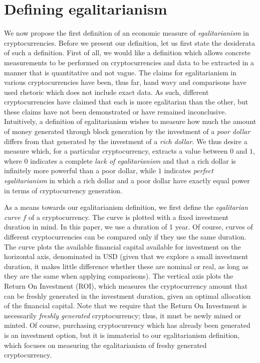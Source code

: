 
\section{Defining egalitarianism}

We now propose the first definition of an economic measure of
\emph{egalitarianism} in cryptocurrencies. Before we present our definition, let
us first state the desiderata of such a definition. First of all, we would like
a definition which allows concrete measurements to be performed on
cryptocurrencies and data to be extracted in a manner that is quantitative and
not vague. The claims for egalitarianism in various cryptocurrencies have been,
thus far, hand wavy and comparisons have used rhetoric which does not include
exact data. As such, different cryptocurrencies have claimed that each is more
egalitarian than the other, but these claims have not been demonstrated or have
remained inconclusive. Intuitively, a definition of egalitarianism wishes to
measure how much the amount of money generated through block generation by the
investment of a \emph{poor dollar} differs from that generated by the investment
of a \emph{rich dollar}. We thus desire a measure which, for a particular
cryptocurrency, extracts a value between $0$ and $1$, where $0$ indicates a
complete \emph{lack of egalitarianism} and that a rich dollar is infinitely more
powerful than a poor dollar, while $1$ indicates \emph{perfect egalitarianism}
in which a rich dollar and a poor dollar have exactly equal power in terms of
cryptocurrency generation.

As a means towards our egalitarianism definition, we first define the
\emph{egalitarian curve} $f$ of a cryptocurrency. The curve is plotted with a
fixed investment duration in mind. In this paper, we use a duration of 1 year.
Of course, curves of different cryptocurrencies can be compared only if they
use the same duration. The curve plots the available financial capital available
for investment on the horizontal axis, denominated in USD (given that we explore
a small investment duration, it makes little difference whether these are
nominal or real, as long as they are the same when applying comparisons). The
vertical axis plots the Return On Investment (ROI), which measures the
cryptocurrency amount that can be freshly generated in the investment duration,
given an optimal allocation of the financial capital. Note that we require that
the Return On Investment is necessarily \emph{freshly generated} cryptocurrency;
thus, it must be newly mined or minted. Of course, purchasing cryptocurrency
which has already been generated is an investment option, but it is immaterial
to our egalitarianism definition, which focuses on measuring the egalitarianism
of freshy generated cryptocurrency.

